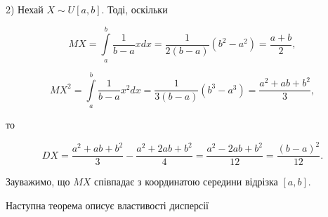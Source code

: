 \begin{example}
    2) Нехай $X \sim U[a, b]$. Тоді, оскільки
    
    $$MX
    = \int\limits_{a}^{b} \frac{1}{b-a} x dx
    = \frac{1}{2(b-a)} (b^2 - a^2)
    = \frac{a+b}{2},$$
    
    $$MX^2
    = \int\limits_{a}^{b} \frac{1}{b-a} x^2 dx
    = \frac{1}{3(b-a)} (b^3 - a^3)
    = \frac{a^2 + ab + b^2}{3},$$
    
    то
    
    $$DX
    = \frac{a^2 + ab + b^2}{3} - \frac{a^2 + 2ab + b^2}{4}
    = \frac{a^2 - 2ab + b^2}{12}
    = \frac{(b-a)^2}{12}.$$
\end{example}
    
Зауважимо, що $MX$ співпадає з координатою
середини відрізка $[a, b]$.

Наступна теорема описує властивості дисперсії

